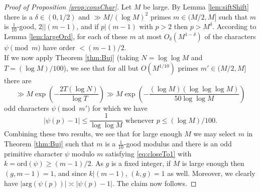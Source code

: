 \documentclass[10pt]{amsart}
\theoremstyle{definition}
\begin{document}
\begin{proof}[Proof of Proposition \ref{prop:consChar}]
Let $M$ be large. By Lemma \ref{lem:siftShift} there is a $\delta \in (0,1/2)$ and $\gg M/(\log M)^2$ primes $m \in (M/2,M]$ such that $m$ is $\tfrac{1}{10}$-good, $2||(m-1)$, and if $p|(m-1)$ with $p > 2$ then $p > M^{\delta}$. According to Lemma \ref{lem:largeOrd}, for each of these $m$ at most $O_{\delta}(M^{1-\delta})$ of the characters $\psi \pmod{m}$ have order $< (m-1)/2$. \\
If we now apply Theorem \ref{thm:Buj} (taking $N = \log \log M$ and $T = (\log M)/100$), we see that for all but $O(M^{1/10})$ primes $m' \in (M/2,M]$ there are 
$$
\gg M\exp\left(-\frac{2T(\log N)}{\log T}\right) \gg M \exp\left(-\frac{(\log M)(\log\log \log M)}{50\log\log M}\right)
$$
odd characters $\psi \pmod{m'}$ for which we have
\begin{equation} \label{eq:closeTo1}
|\psi(p)-1| \leq \frac{1}{\log\log M} \text{ whenever } p \leq (\log M)/100.
\end{equation}
Combining these two results, we see that for large enough $M$ we may select $m$ in Theorem \ref{thm:Buj} such that $m$ is a $\tfrac{1}{10}$-good modulus and there is an odd primitive character $\psi$ modulo $m$ satisfying \eqref{eq:closeTo1} with $k = \text{ord}(\psi) \geq (m-1)/2$. As $g$ is a fixed integer, if $M$ is large enough then $(g,m-1) =1$, and since $k|(m-1)$, $(k,g) = 1$ as well. Moreover, we clearly have $|\text{arg}(\psi(p))| \asymp |\psi(p)-1|$. The claim now follows.
\end{proof}
\end{document}

